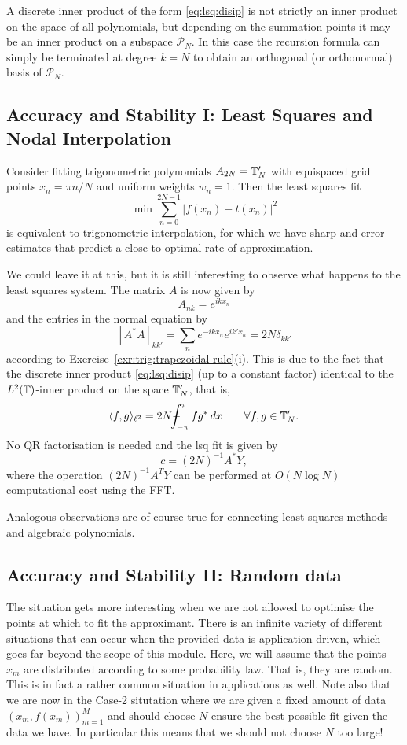 \begin{remark}
    A discrete inner product of the form \eqref{eq:lsq:disip} is not strictly
    an inner product on the space of all polynomials, but depending on the
    summation points it may be an inner product on a subspace $\mathcal{P}_N$.
    In this case the recursion formula can simply be terminated at degree
    $k = N$ to obtain an orthogonal (or orthonormal) basis of $\mathcal{P}_N$.
\end{remark}



\subsection{Accuracy and Stability I: Least Squares and Nodal Interpolation}
%
Consider fitting trigonometric polynomials $A_{2N} = \mathbb{T}_N'$ with equispaced
grid points $x_n = \pi n / N$ and uniform weights $w_n = 1$. Then the
least squares fit
\[
    \min \sum_{n = 0}^{2N-1} |f(x_n) - t(x_n)|^2
\]
is equivalent to trigonometric interpolation, for which we have sharp and error
estimates that predict a close to optimal rate of approximation.

We could leave it at this, but it is still interesting to observe what happens
to the least squares system. The matrix $A$ is now given by
\[
    A_{nk} = e^{ikx_n}
\]
and the entries in the normal equation by
\[
    [A^* A]_{kk'} = \sum_{n} e^{-ikx_n} e^{ik' x_n} = 2 N \delta_{kk'}
\]
according to Exercise~\ref{exr:trig:trapezoidal rule}(i).
This is due to the fact that the discrete inner product
\eqref{eq:lsq:disip}  (up to a constant factor) identical to
the $L^2(\mathbb{T})$-inner product on the space $\mathbb{T}_N'$, that is,
\[
    \< f, g \>_{\ell^2} = 2N \mint_{-\pi}^\pi f g^* \,dx \qquad
    \forall f, g \in \TT_N'.
\]
No QR factorisation is needed and the lsq fit is given by
\[
    c = (2 N)^{-1} A^* Y,
\]
where the operation $(2N)^{-1} A^T Y$ can be performed at $O(N \log N)$
computational cost using the FFT.

Analogous observations are of course true for connecting least squares
methods and algebraic polynomials.


\subsection{Accuracy and Stability II: Random data}
%
\label{sec:lsq:rand}
%
The situation gets more interesting when we are not allowed to optimise the
points at which to fit the approximant. There is an infinite variety of
different situations that can occur when the provided data is application
driven, which goes far beyond the scope of this module. Here, we will assume
that the points $x_m$ are distributed according to some probability law. That
is, they are random. This is in fact a rather common situation in applications
as well. Note also that we are now in the Case-2 situtation where we are given a
fixed amount of data $(x_m, f(x_m))_{m = 1}^M$ and should choose $N$ ensure the
best possible fit given the data we have. In particular this means that we
should not choose $N$ too large!

